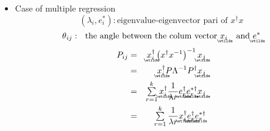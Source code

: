 \documentclass{article}
\begin{document}
\begin{itemize}
\item Case of multiple regression%
\begin{equation*}
\left( \lambda _{i},e_{i}^{\ast }\right) :\text{eigenvalue-eigenvector pari
of }x^{\dagger }x
\end{equation*}%
\begin{equation*}
\theta _{ij}:\text{the angle between the colum vector }%
\underaccent{\wtilde}{x}%
_{i}\text{ and }%
\underaccent{\wtilde}{e}%
^{\ast }
\end{equation*}%
\begin{eqnarray*}
P_{ij} &=&%
\underaccent{\wtilde}{x}%
_{i}^{\dagger }\left( x^{\dagger }x^{-1}\right) ^{-1}%
\underaccent{\wtilde}{x}%
_{j} \\
&=&%
\underaccent{\wtilde}{x}%
_{i}^{\dagger }P\Lambda ^{-1}P^{\dagger }%
\underaccent{\wtilde}{x}%
_{j} \\
&=&\tsum\limits_{r=1}^{k}%
\underaccent{\wtilde}{x}%
_{i}^{\dagger }\frac{1}{\lambda r}%
\underaccent{\wtilde}{e}%
_{r}^{\dagger }%
\underaccent{\wtilde}{e}%
_{r}^{\ast \dagger }%
\underaccent{\wtilde}{x}%
_{j} \\
&=&\tsum\limits_{r=1}^{k}\frac{1}{\lambda r}%
\underaccent{\wtilde}{x}%
_{i}^{\dagger }%
\underaccent{\wtilde}{e}%
_{r}^{\dagger }%
\underaccent{\wtilde}{e}%
_{r}^{\ast \dagger }%

\end{eqnarray*}
\end{itemize}
\end{document}
